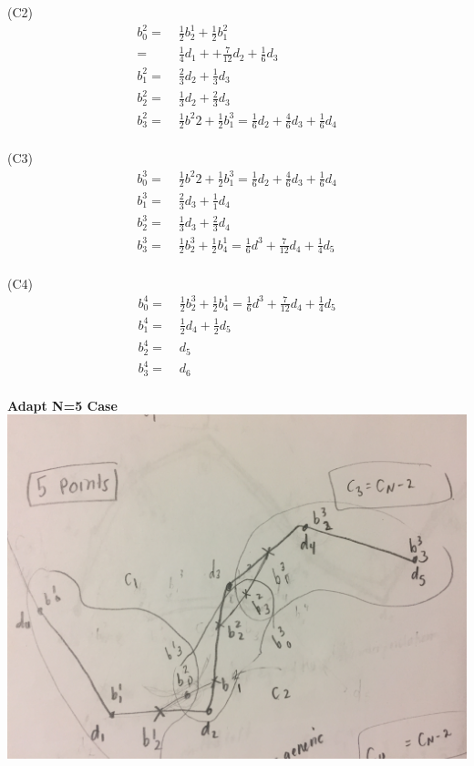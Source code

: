 \documentclass[12pt]{article}
\begin{document}
(C2)
\begin{align*}
b^{2}_{0} =&\; \frac{1}{2} b^{1}_{2} + \frac{1}{2} b^{2}_{1}\\
=&\; \frac{1}{4} d_1 + +\frac{7}{12}d_2 + \frac{1}{6}d_3 \\
b^{2}_{1} =&\; \frac{2}{3} d_2 + \frac{1}{3}d_3 \\
b^{2}_{2} =&\; \frac{1}{3} d_2 + \frac{2}{3}d_3 \\
b^{2}_{3} =&\; \frac{1}{2} b^{2}{2} + \frac{1}{2} b^{3}_{1} =\frac{1}{6}d_2 +\frac{4}{6}d_3 + \frac{1}{6}d_4 \\
\end{align*}

(C3)
\begin{align*}
b^{3}_{0} =&\; \frac{1}{2} b^{2}{2} + \frac{1}{2} b^{3}_{1} =\frac{1}{6}d_2 +\frac{4}{6}d_3 + \frac{1}{6}d_4 \\
b^{3}_{1} =&\; \frac{2}{3}d_3 + \frac{1}{1} d_4 \\
b^{3}_{2} =&\; \frac{1}{3}d_3 + \frac{2}{3} d_4 \\
b^{3}_{3} =&\; \frac{1}{2} b^{3}_{2} + \frac{1}{2}b^{1}_{4} = \frac{1}{6} d^{3} + \frac{7}{12} d_4 + \frac{1}{4} d_5\\
\end{align*}

(C4)
\begin{align*}
b^{4}_{0} =&\; \frac{1}{2} b^{3}_{2} + \frac{1}{2}b^{1}_{4} = \frac{1}{6} d^{3} + \frac{7}{12} d_4 + \frac{1}{4} d_5\\
b^{4}_{1} =&\; \frac{1}{2}d_4 + \frac{1}{2} d_5 \\
b^{4}_{2} =&\; d_5 \\
b^{4}_{3} =&\; d_6 \\
\end{align*}

\vspace {5.25cm}\noindent
{\bf Adapt N=5 Case} \\

\includegraphics[scale=.1]{5Points}
\end{document}
